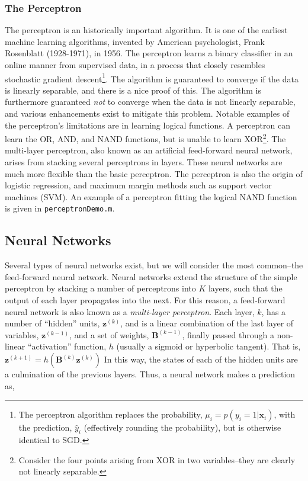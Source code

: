 \documentclass[11pt]{amsart}
\begin{document}
\subsubsection{The Perceptron}
The perceptron is an historically important algorithm. It is one of the earliest machine learning algorithms, invented by American psychologist, Frank Rosenblatt (1928-1971), in 1956. The perceptron learns a binary classifier in an online manner from supervised data, in a process that closely resembles stochastic gradient descent\footnote{The perceptron algorithm replaces the probability, $\mu_i = p(y_i = 1 | \mathbf{x}_i)$, with the prediction, $\hat{y}_i$ (effectively rounding the probability), but is otherwise identical to SGD.}. The algorithm is guaranteed to converge if the data is linearly separable, and there is a nice proof of this. The algorithm is furthermore guaranteed \emph{not} to converge when the data is not linearly separable, and various enhancements exist to mitigate this problem. Notable examples of the perceptron's limitations are in learning logical functions. A perceptron can learn the OR, AND, and NAND functions, but is unable to learn XOR\footnote{Consider the four points arising from XOR in two variables--they are clearly not linearly separable.}. The multi-layer perceptron, also known as an artificial feed-forward neural network, arises from stacking several perceptrons in layers. These neural networks are much more flexible than the basic perceptron. The perceptron is also the origin of logistic regression, and maximum margin methods such as support vector machines (SVM). An example of a perceptron fitting the logical NAND function is given in \texttt{perceptronDemo.m}.

\subsection{Neural Networks}

Several types of neural networks exist, but we will consider the most common--the feed-forward neural network. Neural networks extend the structure of the simple perceptron by stacking a number of perceptrons into $K$ layers, such that the output of each layer propagates into the next. For this reason, a feed-forward neural network is also known as a \emph{multi-layer perceptron}. Each layer, $k$, has a number of ``hidden'' units, $\mathbf{z}^{(k)}$, and is a linear combination of the last layer of variables, $\mathbf{z}^{(k-1)}$, and a set of weights, $\mathbf{B}^{(k-1)}$, finally passed through a non-linear ``activation'' function, $h$ (usually a sigmoid or hyperbolic tangent). That is, $\mathbf{z}^{(k+1)} = h(\mathbf{B}^{(k)}\mathbf{z}^{(k)})$ In this way, the states of each of the hidden units are a culmination of the previous layers. Thus, a neural network makes a prediction as,
\end{document}
